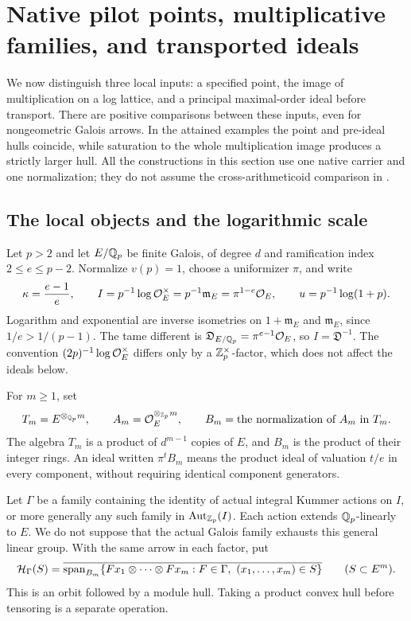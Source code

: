 \section{Native pilot points, multiplicative families, and transported ideals}
\label{sec:native-pilot-dictionary}

We now distinguish three local inputs: a specified point, the image of
multiplication on a log lattice, and a principal maximal-order ideal
before transport. There are positive comparisons between these inputs,
even for nongeometric Galois arrows. In the attained examples the
point and pre-ideal hulls coincide, while saturation to the whole
multiplication image produces a strictly larger hull.
All the constructions in this section use one native carrier and one
normalization; they do not assume the cross-arithmeticoid comparison
in \cite[Theorem~6.10.1]{JoshiIV}.

\subsection{The local objects and the logarithmic scale}

Let $p>2$ and let $E/\mathbb Q_p$ be finite Galois, of degree $d$ and
ramification index $2\le e\le p-2$. Normalize $v(p)=1$, choose a
uniformizer $\pi$, and write
\begin{equation}\label{eq:np-lattice}
 \kappa=\frac{e-1}{e},\qquad
 I=p^{-1}\log\mathcal O_E^\times
   =p^{-1}\mathfrak m_E=\pi^{1-e}\mathcal O_E,\qquad
 u=p^{-1}\log(1+p).
\end{equation}
Logarithm and exponential are inverse isometries on
$1+\mathfrak m_E$ and $\mathfrak m_E$, since
$1/e>1/(p-1)$. The tame different is
$\mathfrak D_{E/\mathbb Q_p}=\pi^{e-1}\mathcal O_E$, so $I=\mathfrak D^{-1}$.
The convention $(2p)^{-1}\log\mathcal O_E^\times$ differs only by a
$\mathbb Z_p^\times$-factor, which does not affect the ideals below.

For $m\ge1$, set
\[
 T_m=E^{\otimes_{\mathbb Q_p}m},\qquad
 A_m=\mathcal O_E^{\otimes_{\mathbb Z_p}m},\qquad
 B_m=\text{the normalization of }A_m\text{ in }T_m.
\]
The algebra $T_m$ is a product of $d^{m-1}$ copies of $E$, and
$B_m$ is the product of their integer rings. An ideal written
$\pi^tB_m$ means the product ideal of valuation $t/e$ in every
component, without requiring identical component generators.

Let $\Gamma$ be a family containing the identity of actual integral
Kummer actions on $I$, or more generally any such family in
$\operatorname{Aut}_{\mathbb Z_p}(I)$. Each action extends $\mathbb Q_p$-linearly
to $E$. We do not suppose that the actual Galois family exhausts
this general linear group. With the same arrow in each factor, put
\begin{equation}\label{eq:np-hull}
 \mathcal H_\Gamma(S)=
 \overline{\operatorname{span}_{B_m}
 \{Fx_1\otimes\cdots\otimes Fx_m:
             F\in\Gamma,\ (x_1,\ldots,x_m)\in S\}}
 \qquad(S\subset E^m).
\end{equation}
This is an orbit followed by a module hull. Taking a product convex
hull before tensoring is a separate operation.

